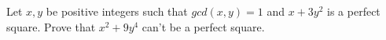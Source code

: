Let $x, y$ be positive integers such that $gcd(x, y) = 1$ and $x + 3y^2$ is a perfect square. Prove that $x^2 + 9y^4$ can't
be a perfect square.